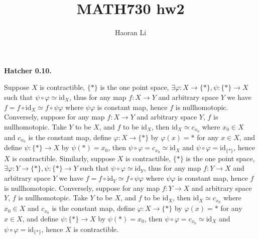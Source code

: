 \documentclass{article}
\title{MATH730 hw2}
\author{Haoran Li}
\date{}
\begin{document}
\maketitle

\textbf{Hatcher 0.10.} \par
Suppose $X$ is contractible, $\{*\}$ is the one point space, $\exists \varphi:X\rightarrow \{*\}, \psi:\{*\}\rightarrow X$ such that $\psi\circ\varphi \simeq \mathrm{id}_{X}$, thus for any map $f:X\rightarrow Y$ and arbitrary space $Y$ we have $ f= f\circ\mathrm{id}_{X} \simeq f\circ\psi\varphi $ where \(\psi\varphi\) is constant map, hence $f$ is nullhomotopic. Conversely, suppose for any map $f:X\rightarrow Y$ and arbitrary space $Y$, $f$ is nullhomotopic. Take $Y$ to be $X$, and $f$ to be $\mathrm{id}_{X}$, then $\mathrm{id}_{X}\simeq c_{x_{0}}$ where $x_{0}\in X$ and $c_{x_{0}}$ is the constant map, define $\varphi:X\rightarrow \{*\}$ by $\varphi(x)=*$ for any $x\in X$, and define $\psi:\{*\}\rightarrow X$ by $\psi(*)=x_{0}$, then $\psi\circ\varphi=c_{x_{0}}\simeq\mathrm{id}_{X}$ and $\psi\circ\varphi=\mathrm{id}_{\{*\}}$, hence $X$ is contractible.
Similarly, suppose $X$ is contractible, $\{*\}$ is the one point space, $\exists \varphi:Y\rightarrow \{*\}, \psi:\{*\}\rightarrow Y$ such that $\psi\circ\varphi \simeq \mathrm{id}_{Y}$, thus for any map $f:Y\rightarrow X$ and arbitrary space $Y$ we have $ f=f\circ\mathrm{id}_{Y}\simeq f\circ\psi\varphi $ where \(\psi\varphi\) is constant map, hence $f$ is nullhomotopic. Conversely, suppose for any map $f:Y\rightarrow X$ and arbitrary space $Y$, $f$ is nullhomotopic. Take $Y$ to be $X$, and $f$ to be $\mathrm{id}_{X}$, then $\mathrm{id}_{X}\simeq c_{x_{0}}$ where $x_{0}\in X$ and $c_{x_{0}}$ is the constant map, define $\varphi:X\rightarrow \{*\}$ by $\varphi(x)=*$ for any $x\in X$, and define $\psi:\{*\}\rightarrow X$ by $\psi(*)=x_{0}$, then $\psi\circ\varphi=c_{x_{0}}\simeq\mathrm{id}_{X}$ and $\psi\circ\varphi=\mathrm{id}_{\{*\}}$, hence $X$ is contractible.
\end{document}
